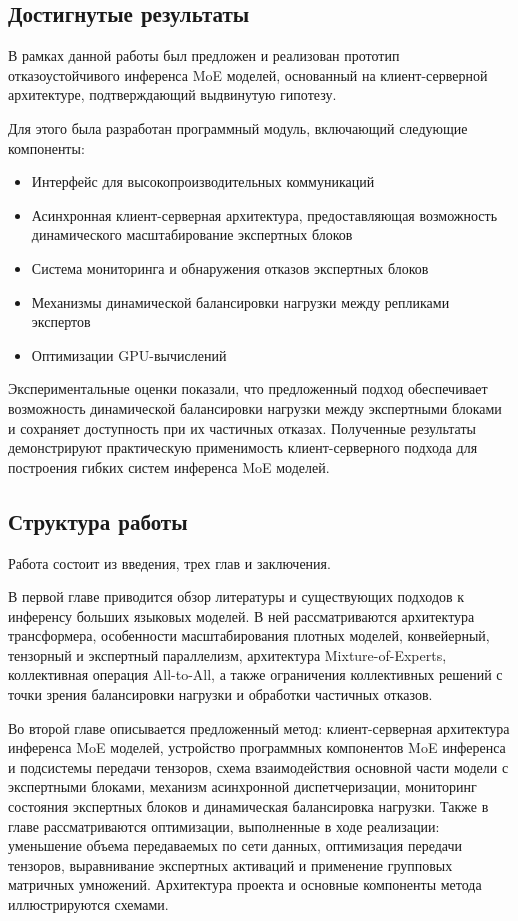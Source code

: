 \subsection*{Достигнутые результаты}

В рамках данной работы был предложен и реализован прототип отказоустойчивого инференса MoE моделей, основанный на клиент-серверной архитектуре, подтверждающий выдвинутую гипотезу.

Для этого была разработан программный модуль, включающий следующие компоненты:

\begin{itemize}
    \item Интерфейс для высокопроизводительных коммуникаций
    \item Асинхронная клиент-серверная архитектура, предоставляющая возможность динамического масштабирование экспертных блоков
    \item Система мониторинга и обнаружения отказов экспертных блоков
    \item Механизмы динамической балансировки нагрузки между репликами экспертов
    \item Оптимизации GPU-вычислений
\end{itemize}

Экспериментальные оценки показали, что предложенный подход обеспечивает возможность динамической балансировки нагрузки между экспертными блоками и сохраняет доступность при их частичных отказах. Полученные результаты демонстрируют практическую применимость клиент-серверного подхода для построения гибких систем инференса MoE моделей.

\subsection*{Структура работы}

Работа состоит из введения, трех глав и заключения.

В первой главе приводится обзор литературы и существующих подходов к инференсу больших языковых моделей. В ней рассматриваются архитектура трансформера, особенности масштабирования плотных моделей, конвейерный, тензорный и экспертный параллелизм, архитектура Mixture-of-Experts, коллективная операция All-to-All, а также ограничения коллективных решений с точки зрения балансировки нагрузки и обработки частичных отказов.

Во второй главе описывается предложенный метод: клиент-серверная архитектура инференса MoE моделей, устройство программных компонентов MoE инференса и подсистемы передачи тензоров, схема взаимодействия основной части модели с экспертными блоками, механизм асинхронной диспетчеризации, мониторинг состояния экспертных блоков и динамическая балансировка нагрузки. Также в главе рассматриваются оптимизации, выполненные в ходе реализации: уменьшение объема передаваемых по сети данных, оптимизация передачи тензоров, выравнивание экспертных активаций и применение групповых матричных умножений. Архитектура проекта и основные компоненты метода иллюстрируются схемами.

